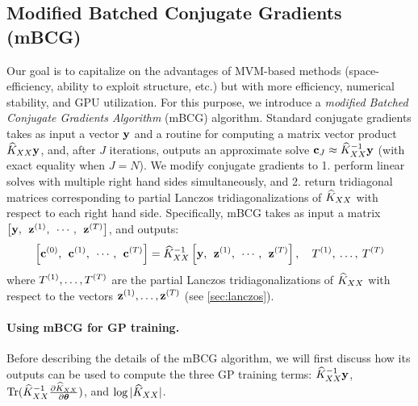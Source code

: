 \subsection{Modified Batched Conjugate Gradients (mBCG)}
Our goal is to capitalize on the advantages of MVM-based methods (space-efficiency, ability to exploit structure, etc.) but with more efficiency, numerical stability, and GPU utilization.
For this purpose, we introduce a \emph{modified Batched Conjugate Gradients Algorithm} (mBCG) algorithm.
Standard conjugate gradients takes as input a vector $\mathbf{y}$ and a routine for computing a matrix vector product $\widehat{K}_{XX}\mathbf{y}$, and, after $J$ iterations, outputs an approximate solve $\mathbf{c}_{J} \approx \widehat{K}_{XX}^{-1}\mathbf{y}$ (with exact equality when $J = N$).
We modify conjugate gradients to 1. perform linear solves with multiple right hand sides simultaneously, and 2. return tridiagonal matrices corresponding to partial Lanczos tridiagonalizations of $\widehat{K}_{XX}$ with respect to each right hand side.
Specifically, mBCG takes as input a matrix $\left[ \mathbf{y}, \:\: \mathbf{z}^{(1)}, \:\: \cdots, \:\: \mathbf{z}^{(T)} \right]$, and outputs:
\begin{equation}
  \label{eqn:mod_cg_call}
  \left[ \mathbf{c}^{(0)}, \:\: \mathbf{c}^{(1)}, \:\: \cdots, \:\: \mathbf{c}^{(T)} \right] = \widehat{K}_{XX}^{-1} \left[ \mathbf{y}, \:\: \mathbf{z}^{(1)}, \:\: \cdots, \:\: \mathbf{z}^{(T)} \right], \quad T^{(1)}, \: \ldots, \: T^{(T)}
\end{equation}
where $T^{(1)}, \ldots, T^{(T)}$ are the partial Lanczos tridiagonalizations of $\widehat{K}_{XX}$ with respect to the vectors $\mathbf{z}^{(1)}, \ldots, \mathbf{z}^{(T)}$ (see \cref{sec:lanczos}).

\paragraph{Using mBCG for GP training.}
Before describing the details of the mBCG algorithm, we will first discuss how its outputs can be used to compute the three GP training terms:
$\widehat{K}_{XX}^{-1} \mathbf{y}$, $\tr{ \trainK^{-1} \frac{\partial \trainK}{\partial \btheta} }$, and $\log \vert \widehat{K}_{XX} \vert$.

